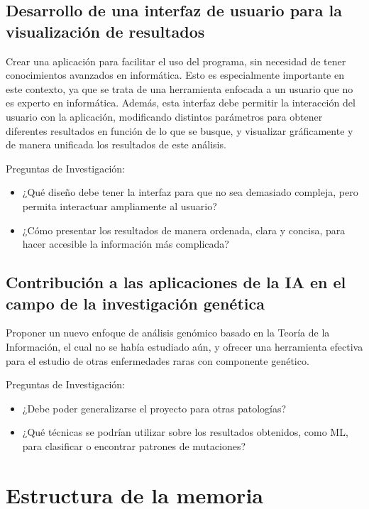 \documentclass[11pt,spanish,listoffigures,listoftables]{tfgetsinf}
\begin{document}
\subsection{Desarrollo de una interfaz de usuario para la visualización de resultados }

Crear una aplicación para facilitar el uso del programa, sin necesidad de tener conocimientos avanzados en informática. Esto es especialmente importante en este contexto, ya que se trata de una herramienta enfocada a un usuario que no es experto en informática. Además, esta interfaz debe permitir la interacción del usuario con la aplicación, modificando distintos parámetros para obtener diferentes resultados en función de lo que se busque, y visualizar gráficamente y de manera unificada los resultados de este análisis. 

Preguntas de Investigación: 
\begin{itemize}
\item ¿Qué diseño debe tener la interfaz para que no sea demasiado compleja, pero permita interactuar ampliamente al usuario? 
\item ¿Cómo presentar los resultados de manera ordenada, clara y concisa, para hacer accesible la información más complicada? 
\end{itemize}

\subsection{Contribución a las aplicaciones de la \ac{IA} en el campo de la investigación genética }

Proponer un nuevo enfoque de análisis genómico basado en la Teoría de la Información, el cual no se había estudiado aún, y ofrecer una herramienta efectiva para el estudio de otras enfermedades raras con componente genético. 

Preguntas de Investigación: 
\begin{itemize}
\item ¿Debe poder generalizarse el proyecto para otras patologías? 
\item ¿Qué técnicas se podrían utilizar sobre los resultados obtenidos, como \ac{ML}, para clasificar o encontrar patrones de mutaciones? 
\end{itemize}


\section{Estructura de la memoria}
\end{document}
